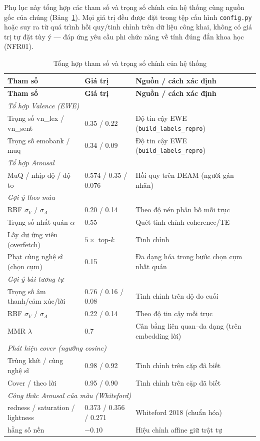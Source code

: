 \documentclass[../DoAn.tex]{subfiles}
\begin{document}
\label{appendix:params}
Phụ lục này tổng hợp các tham số và trọng số chính của hệ thống cùng nguồn gốc của chúng (Bảng~\ref{table:params}). Mọi giá trị đều được đặt trong tệp cấu hình \texttt{config.py} hoặc suy ra từ quá trình hồi quy/tinh chỉnh trên dữ liệu công khai, không có giá trị tự đặt tùy ý --- đáp ứng yêu cầu phi chức năng về tính đúng đắn khoa học (NFR01).

\begin{longtable}{|p{4.6cm}|p{4.0cm}|p{4.6cm}|}
\caption{Tổng hợp tham số và trọng số chính của hệ thống}\label{table:params}\\
\hline
\textbf{Tham số} & \textbf{Giá trị} & \textbf{Nguồn / cách xác định} \\
\hline
\endfirsthead
\hline
\textbf{Tham số} & \textbf{Giá trị} & \textbf{Nguồn / cách xác định} \\
\hline
\endhead
\multicolumn{3}{|l|}{\textit{Tổ hợp Valence (EWE)}} \\
\hline
Trọng số vn\_lex / vn\_sent & 0.35 / 0.22 & Độ tin cậy EWE (\texttt{build\_labels\_repro}) \\
\hline
Trọng số emobank / muq & 0.34 / 0.09 & Độ tin cậy EWE (\texttt{build\_labels\_repro}) \\
\hline
\multicolumn{3}{|l|}{\textit{Tổ hợp Arousal}} \\
\hline
MuQ / nhịp độ / độ to & 0.574 / 0.35 / 0.076 & Hồi quy trên DEAM (người gán nhãn) \\
\hline
\multicolumn{3}{|l|}{\textit{Gợi ý theo màu}} \\
\hline
RBF $\sigma_V$ / $\sigma_A$ & 0.20 / 0.14 & Theo độ nén phân bố mỗi trục \\
\hline
Trọng số nhất quán $\alpha$ & 0.55 & Quét tinh chỉnh coherence/TE \\
\hline
Lấy dư ứng viên (overfetch) & $5 \times$ top-$k$ & Tinh chỉnh \\
\hline
Phạt cùng nghệ sĩ (chọn cụm) & 0.15 & Đa dạng hóa trong bước chọn cụm nhất quán \\
\hline
\multicolumn{3}{|l|}{\textit{Gợi ý bài tương tự}} \\
\hline
Trọng số âm thanh/cảm xúc/lời & 0.76 / 0.16 / 0.08 & Tinh chỉnh trên độ đo cuối \\
\hline
RBF $\sigma_V$ / $\sigma_A$ & 0.22 / 0.14 & Theo độ tin cậy mỗi trục \\
\hline
MMR $\lambda$ & 0.7 & Cân bằng liên quan--đa dạng (trên embedding lời) \\
\hline
\multicolumn{3}{|l|}{\textit{Phát hiện cover (ngưỡng cosine)}} \\
\hline
Trùng khít / cùng nghệ sĩ & 0.98 / 0.92 & Tinh chỉnh trên cặp đã biết \\
\hline
Cover / theo lời & 0.95 / 0.90 & Tinh chỉnh trên cặp đã biết \\
\hline
\multicolumn{3}{|l|}{\textit{Công thức Arousal của màu (Whiteford)}} \\
\hline
redness / saturation / lightness & 0.373 / 0.356 / 0.271 & Whiteford 2018 (chuẩn hóa) \\
\hline
hằng số nền & $-0.10$ & Hiệu chỉnh affine giữ trật tự \\
\hline
\end{longtable}
\end{document}
